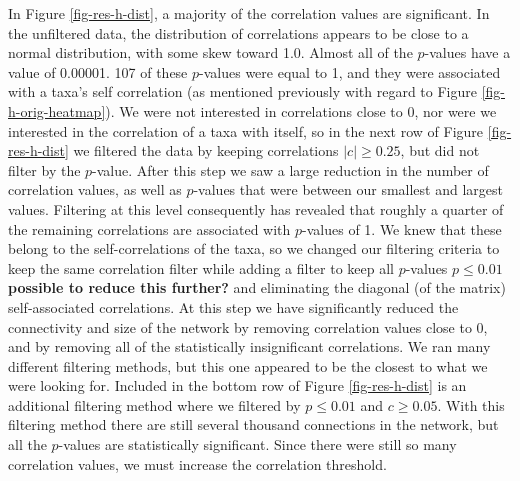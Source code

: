  In Figure \ref{fig-res-h-dist}, a majority of the correlation values are significant. In the unfiltered data, the distribution of correlations appears to be close to a normal distribution, with some skew toward 1.0. Almost all of the $p$-values have a value of 0.00001. 107 of these $p$-values were equal to 1, and they were associated with a taxa's self correlation (as mentioned previously with regard to Figure \ref{fig-h-orig-heatmap}). We were not interested in correlations close to 0, nor were we interested in the correlation of a taxa with itself, so in the next row of Figure \ref{fig-res-h-dist} we filtered the data by keeping correlations $|c| \geq 0.25$, but did not filter by the $p$-value. After this step we saw a large reduction in the number of correlation values, as well as $p$-values that were between our smallest and largest values. Filtering at this level consequently has revealed that roughly a quarter of the remaining correlations are associated with $p$-values of 1. We knew that these belong to the self-correlations of the taxa, so we changed our filtering criteria to keep the same correlation filter while adding a filter to keep all $p$-values $p \leq 0.01$\textbf{possible to reduce this further?} and eliminating the diagonal (of the matrix) self-associated correlations. At this step we have significantly reduced the connectivity and size of the network by removing correlation values close to 0, and by removing all of the statistically insignificant correlations. We ran many different filtering methods, but this one appeared to be the closest to what we were looking for. Included in the bottom row of Figure \ref{fig-res-h-dist} is an additional filtering method where we filtered by $p \leq 0.01$ and $c \geq 0.05$. With this filtering method there are still several thousand connections in the network, but all the $p$-values are statistically significant. Since there were still so many correlation values, we must increase the correlation threshold. 

